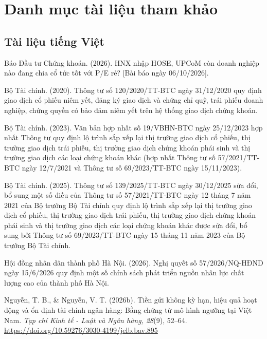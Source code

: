 \chapter*{Danh mục tài liệu tham khảo}\label{ch:11}

\section*{Tài liệu tiếng Việt}
\begin{list}{}{\setlength{\leftmargin}{1.5em}\setlength{\itemindent}{-1.5em}\setlength{\itemsep}{2pt}\small}
\item Báo Đầu tư Chứng khoán. (2026). HNX nhập HOSE, UPCoM còn doanh nghiệp nào đang chia cổ tức tốt với P/E rẻ? [Bài báo ngày 06/10/2026].
\item Bộ Tài chính. (2020). Thông tư số 120/2020/TT-BTC ngày 31/12/2020 quy định giao dịch cổ phiếu niêm yết, đăng ký giao dịch và chứng chỉ quỹ, trái phiếu doanh nghiệp, chứng quyền có bảo đảm niêm yết trên hệ thống giao dịch chứng khoán.
\item Bộ Tài chính. (2023). Văn bản hợp nhất số 19/VBHN-BTC ngày 25/12/2023 hợp nhất Thông tư quy định lộ trình sắp xếp lại thị trường giao dịch cổ phiếu, thị trường giao dịch trái phiếu, thị trường giao dịch chứng khoán phái sinh và thị trường giao dịch các loại chứng khoán khác (hợp nhất Thông tư số 57/2021/TT-BTC ngày 12/7/2021 và Thông tư số 69/2023/TT-BTC ngày 15/11/2023).
\item Bộ Tài chính. (2025). Thông tư số 139/2025/TT-BTC ngày 30/12/2025 sửa đổi, bổ sung một số điều của Thông tư số 57/2021/TT-BTC ngày 12 tháng 7 năm 2021 của Bộ trưởng Bộ Tài chính quy định lộ trình sắp xếp lại thị trường giao dịch cổ phiếu, thị trường giao dịch trái phiếu, thị trường giao dịch chứng khoán phái sinh và thị trường giao dịch các loại chứng khoán khác được sửa đổi, bổ sung bởi Thông tư số 69/2023/TT-BTC ngày 15 tháng 11 năm 2023 của Bộ trưởng Bộ Tài chính.
\item Hội đồng nhân dân thành phố Hà Nội. (2026). Nghị quyết số 57/2026/NQ-HĐND ngày 15/6/2026 quy định một số chính sách phát triển nguồn nhân lực chất lượng cao của thành phố Hà Nội.
\item Nguyễn, T. B., \& Nguyễn, V. T. (2026b). Tiền gửi không kỳ hạn, hiệu quả hoạt động và ổn định tài chính ngân hàng: Bằng chứng từ mô hình ngưỡng tại Việt Nam. \emph{Tạp chí Kinh tế - Luật và Ngân hàng, 28}(9), 52–64. \url{https://doi.org/10.59276/3030-4199/jelb.bav.895}

\end{list}
